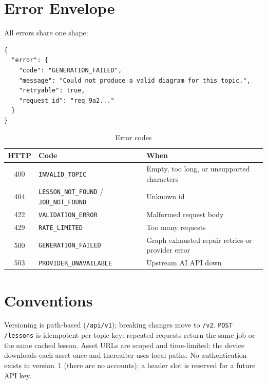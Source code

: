\section{Error Envelope}

All errors share one shape:

\begin{lstlisting}[style=code]
{
  "error": {
    "code": "GENERATION_FAILED",
    "message": "Could not produce a valid diagram for this topic.",
    "retryable": true,
    "request_id": "req_9a2..."
  }
}
\end{lstlisting}

\begin{table}[htbp]
\caption{Error codes}
\label{tab:errors}
\centering
\small
\renewcommand{\arraystretch}{1.3}
\begin{tabular}{@{}clp{}@{}}
\toprule
\textbf{HTTP} & \textbf{Code} & \textbf{When}\\
\midrule
400 & \texttt{INVALID\_TOPIC} & Empty, too long, or unsupported characters\\
404 & \texttt{LESSON\_NOT\_FOUND} / \texttt{JOB\_NOT\_FOUND} & Unknown id\\
422 & \texttt{VALIDATION\_ERROR} & Malformed request body\\
429 & \texttt{RATE\_LIMITED} & Too many requests\\
500 & \texttt{GENERATION\_FAILED} & Graph exhausted repair retries or
provider error\\
503 & \texttt{PROVIDER\_UNAVAILABLE} & Upstream AI API down\\
\bottomrule
\end{tabular}
\end{table}

\section{Conventions}

Versioning is path-based (\texttt{/api/v1}); breaking changes move to
\texttt{/v2}. \texttt{POST /lessons} is idempotent per topic key: repeated
requests return the same job or the same cached lesson. Asset URLs are
scoped and time-limited; the device downloads each asset once and thereafter
uses local paths. No authentication exists in version~1 (there are no
accounts); a header slot is reserved for a future API key.

